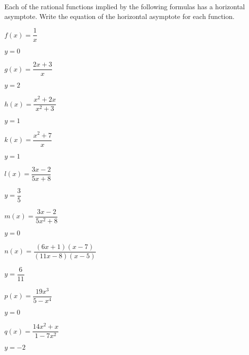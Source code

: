 \begin{exercises}
\begin{problem}
Each of the rational functions implied by the following formulas has a 
horizontal asymptote. Write the equation of the horizontal asymptote for each function.
\begin{multicols}{3}
	\begin{subproblem}
		$f(x) = \dfrac{1}{x}$
		\begin{shortsolution}
			$y=0$
		\end{shortsolution}
	\end{subproblem}
	\begin{subproblem}
		$g(x) = \dfrac{2x+3}{x}$
		\begin{shortsolution}
			$y=2$
		\end{shortsolution}
	\end{subproblem}
	\begin{subproblem}
		$h(x) = \dfrac{x^2+2x}{x^2+3}$
		\begin{shortsolution}
			$y=1$
		\end{shortsolution}
	\end{subproblem}
	\begin{subproblem}
		$k(x) = \dfrac{x^2+7}{x}$
		\begin{shortsolution}
			$y=1$
		\end{shortsolution}
	\end{subproblem}
	\begin{subproblem}
		$l(x)=\dfrac{3x-2}{5x+8}$ 
		\begin{shortsolution}
			$y=\dfrac{3}{5}$
		\end{shortsolution}
	\end{subproblem}
	\begin{subproblem}
		$m(x)=\dfrac{3x-2}{5x^2+8}$ 
		\begin{shortsolution}
			$y=0$
		\end{shortsolution}
	\end{subproblem}
	\begin{subproblem}
		$n(x)=\dfrac{(6x+1)(x-7)}{(11x-8)(x-5)}$ 
		\begin{shortsolution}
			$y=\dfrac{6}{11}$
		\end{shortsolution}
	\end{subproblem}
	\begin{subproblem}
		$p(x)=\dfrac{19x^3}{5-x^4}$ 
		\begin{shortsolution}
			$y=0$
		\end{shortsolution}
	\end{subproblem}
	\begin{subproblem}
		$q(x)=\dfrac{14x^2+x}{1-7x^2}$ 
		\begin{shortsolution}
			$y=-2$
		\end{shortsolution}
	\end{subproblem}
\end{multicols}
\end{problem}


\end{exercises}
